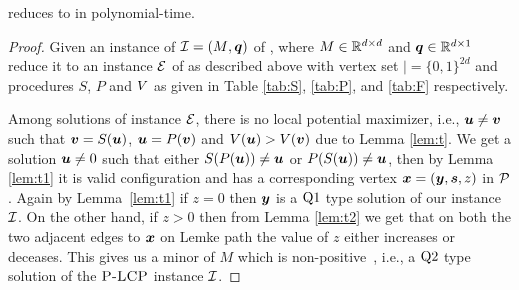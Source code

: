 \begin{theorem}
\PLCP reduces to \EOPL in polynomial-time. 
\end{theorem}
\begin{proof}
	Given an instance of $\mbox{${\mathcal I}$}=(\mbox{$M$},\mbox{\boldmath $q$})$ of \PLCP, where $M\in \mathbb{R}^{d\times d}$ and $\mbox{\boldmath $q$}\in \mathbb{R}^{d\times 1}$ reduce it to an instance $\mbox{${\mathcal E}$}$ of \EOPL as described above with vertex set $\vert=\{0,1\}^{2d}$ and procedures $S$, $P$ and $\mbox{$V$}$ as given in Table \ref{tab:S}, \ref{tab:P}, and \ref{tab:F} respectively.

Among solutions of \EOPL instance $\mbox{${\mathcal E}$}$, there is no local potential maximizer,
	i.e., $\mbox{\boldmath $u$}\neq \mbox{\boldmath $v$}$ such that $\mbox{\boldmath $v$}=S(\mbox{\boldmath $u$})$, $\mbox{\boldmath $u$}=P(\mbox{\boldmath $v$})$ and $\mbox{$V$}(\mbox{\boldmath $u$})>\mbox{$V$}(\mbox{\boldmath $v$})$
	due to Lemma \ref{lem:t}. We get a solution $\mbox{\boldmath $u$} \neq 0$ such that either
	$S(P(\mbox{\boldmath $u$}))\neq \mbox{\boldmath $u$}$ or $P(S(\mbox{\boldmath $u$}))\neq \mbox{\boldmath $u$}$, then by Lemma \ref{lem:t1} it is
	valid configuration and has a corresponding vertex $\mbox{\boldmath $x$}=(\mbox{\boldmath $y$},\mbox{\boldmath $s$},z)$ in
	$\mbox{${\mathcal P}$}$. Again by Lemma~\ref{lem:t1} if $z=0$ then $\mbox{\boldmath $y$}$ is a $\mbox{Q1}$ type solution
	of our \PLCP instance $\mbox{${\mathcal I}$}$. On the other hand, if $z>0$ then from Lemma
	\ref{lem:t2} we get that on both the two adjacent edges to $\mbox{\boldmath $x$}$ on Lemke
	path the value of $z$ either increases or deceases. This gives us a minor of $M$
	which is non-positive~\cite{cottle2009linear}, 
	i.e., a $\mbox{Q2}$ type solution of the $\textsc{P-LCP}$	instance $\mbox{${\mathcal I}$}$.
\end{proof}

\newpage



